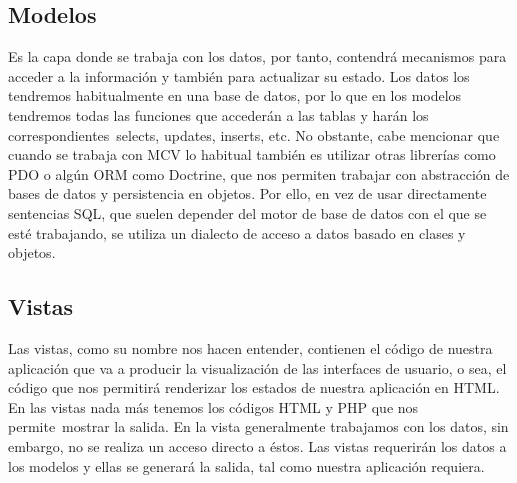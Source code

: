 \subsection{Modelos}

Es la capa donde se trabaja con los datos, por tanto, contendrá mecanismos para acceder a la información y también para actualizar su estado. Los datos los tendremos habitualmente en una base de datos, por lo que en los modelos tendremos todas las funciones que accederán a las tablas y harán los correspondientes selects, updates, inserts, etc.
No obstante, cabe mencionar que cuando se trabaja con MCV lo habitual también es utilizar otras librerías como PDO o algún ORM como Doctrine, que nos permiten trabajar con abstracción de bases de datos y persistencia en objetos. Por ello, en vez de usar directamente sentencias SQL, que suelen depender del motor de base de datos con el que se esté trabajando, se utiliza un dialecto de acceso a datos basado en clases y objetos. \cite{marco3}


\subsection{Vistas}
Las vistas, como su nombre nos hacen entender, contienen el código de nuestra aplicación que va a producir la visualización de las interfaces de usuario, o sea, el código que nos permitirá renderizar los estados de nuestra aplicación en HTML. En las vistas nada más tenemos los códigos HTML y PHP que nos permite mostrar la salida.
En la vista generalmente trabajamos con los datos, sin embargo, no se realiza un acceso directo a éstos. Las vistas requerirán los datos a los modelos y ellas se generará la salida, tal como nuestra aplicación requiera. \cite{marco3}

